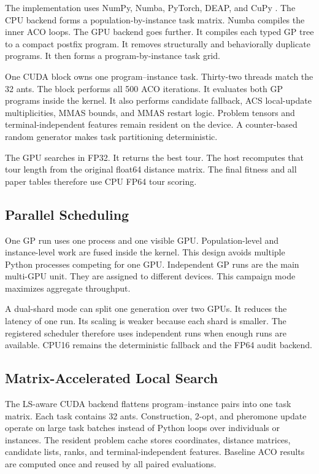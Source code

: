 \documentclass[letterpaper,journal]{IEEEtran}
\begin{document}
The implementation uses NumPy, Numba, PyTorch, DEAP, and CuPy \cite{harris2020numpy,lam2015numba,paszke2019pytorch,fortin2012deap,okuta2017cupy}.
The CPU backend forms a population-by-instance task matrix.
Numba compiles the inner ACO loops.
The GPU backend goes further.
It compiles each typed GP tree to a compact postfix program.
It removes structurally and behaviorally duplicate programs.
It then forms a program-by-instance task grid.

One CUDA block owns one program--instance task.
Thirty-two threads match the 32 ants.
The block performs all 500 ACO iterations.
It evaluates both GP programs inside the kernel.
It also performs candidate fallback, ACS local-update multiplicities, MMAS bounds, and MMAS restart logic.
Problem tensors and terminal-independent features remain resident on the device.
A counter-based random generator makes task partitioning deterministic.

The GPU searches in FP32.
It returns the best tour.
The host recomputes that tour length from the original float64 distance matrix.
The final fitness and all paper tables therefore use CPU FP64 tour scoring.

\subsection{Parallel Scheduling}

One GP run uses one process and one visible GPU.
Population-level and instance-level work are fused inside the kernel.
This design avoids multiple Python processes competing for one GPU.
Independent GP runs are the main multi-GPU unit.
They are assigned to different devices.
This campaign mode maximizes aggregate throughput.

A dual-shard mode can split one generation over two GPUs.
It reduces the latency of one run.
Its scaling is weaker because each shard is smaller.
The registered scheduler therefore uses independent runs when enough runs are available.
CPU16 remains the deterministic fallback and the FP64 audit backend.

\subsection{Matrix-Accelerated Local Search}

The LS-aware CUDA backend flattens program--instance pairs into one task
matrix.
Each task contains 32 ants.
Construction, 2-opt, and pheromone update operate on large task batches
instead of Python loops over individuals or instances.
The resident problem cache stores coordinates, distance matrices, candidate
lists, ranks, and terminal-independent features.
Baseline ACO results are computed once and reused by all paired evaluations.
\end{document}
